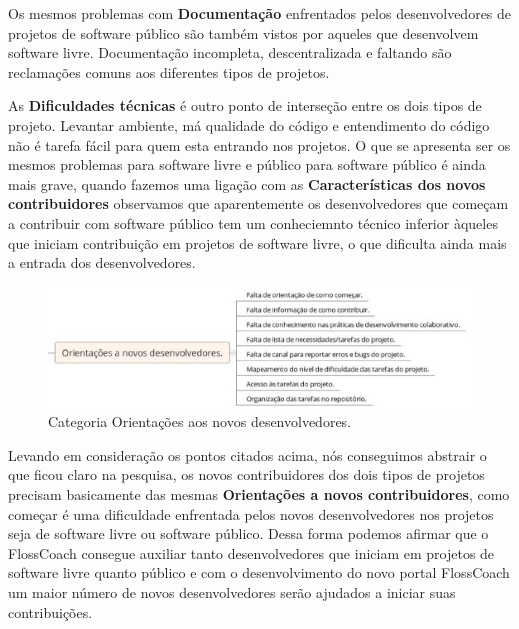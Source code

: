 Os mesmos problemas com \textbf{Documentação} enfrentados pelos desenvolvedores de 
projetos de software público são também vistos por aqueles que desenvolvem software 
livre. Documentação incompleta, descentralizada e faltando são reclamações comuns aos
diferentes tipos de projetos.

As \textbf{Dificuldades técnicas} é outro ponto de interseção entre os dois tipos
de projeto. Levantar ambiente, má qualidade do código e entendimento do código
não é tarefa fácil para quem esta entrando nos projetos. O que se apresenta ser
os mesmos problemas para software livre e público para software público é ainda
mais grave, quando fazemos uma ligação com as \textbf{Características dos novos contribuidores}
observamos que aparentemente os desenvolvedores que começam a contribuir com software
público tem um conheciemnto técnico inferior àqueles que iniciam contribuição em 
projetos de software livre, o que dificulta ainda mais a entrada dos desenvolvedores.

\begin{figure}[h]
	\centering
	\label{fig:orientacoes}
		\includegraphics[keepaspectratio=true,scale=0.5]{figuras/orientacoes.eps}
	\caption{Categoria Orientações aos novos desenvolvedores.}
\end{figure}

Levando em consideração os pontos citados acima, nós conseguimos abstrair o que
ficou claro na pesquisa, os novos contribuidores dos dois tipos de projetos precisam
basicamente das mesmas \textbf{Orientações a novos contribuidores}, como começar é 
uma dificuldade enfrentada pelos novos desenvolvedores nos projetos seja de 
software livre ou software público. Dessa forma podemos afirmar que o
FlossCoach consegue auxiliar tanto desenvolvedores que iniciam em projetos de software
livre quanto público e com o desenvolvimento do novo portal FlossCoach um maior
número de novos desenvolvedores serão ajudados a iniciar suas contribuições.


